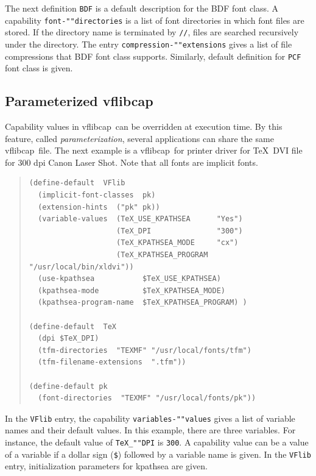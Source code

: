 \documentclass{cah-gut}
\newcommand{\pkg}[1]{\textsf{#1}}
\newcommand{\prog}[1]{\texttt{#1}}
\newcommand{\vflibcap}{\pkg{vflibcap}}
\begin{document}
The next definition \prog{BDF} is a default description for the BDF
font class.  A capability \prog{font-""directories} is a list of font
directories in which font files are stored.  If the directory name is
terminated by \prog{//}, files are searched recursively under the
directory.  The entry \prog{compression-""extensions} gives a list of
file compressions that BDF font class supports.
Similarly, default definition for \prog{PCF} font class is given.

\subsection{Parameterized \vflibcap}
\label{SUBSEC:VFLIBCAP:PARAM}

Capability values in \vflibcap\ can be overridden at execution time.
By this feature, called {\em parameterization}, several applications 
can share the same \vflibcap\ file.
The next example is a \vflibcap\ for printer driver for \TeX\ DVI file
for 300 dpi Canon Laser Shot.
Note that all fonts are implicit fonts.

\begin{quote}
\begin{small}\setlength{\baselineskip}{1em}
\begin{verbatim}
(define-default  VFlib
  (implicit-font-classes  pk)
  (extension-hints  ("pk" pk))
  (variable-values  (TeX_USE_KPATHSEA      "Yes")
                    (TeX_DPI               "300")
                    (TeX_KPATHSEA_MODE     "cx")
                    (TeX_KPATHSEA_PROGRAM  "/usr/local/bin/xldvi"))
  (use-kpathsea           $TeX_USE_KPATHSEA)
  (kpathsea-mode          $TeX_KPATHSEA_MODE)
  (kpathsea-program-name  $TeX_KPATHSEA_PROGRAM) )

(define-default  TeX
  (dpi $TeX_DPI)
  (tfm-directories  "TEXMF" "/usr/local/fonts/tfm")
  (tfm-filename-extensions  ".tfm"))

(define-default pk
  (font-directories  "TEXMF" "/usr/local/fonts/pk"))
\end{verbatim}
\end{small}
\end{quote}

In the \prog{VFlib} entry, the capability \prog{variables-""values}
gives a list of variable names and their default values.  In this
example, there are three variables. For instance, the default value of
\prog{TeX\_""DPI} is \prog{300}.  A capability value can be a value of
a variable if a dollar sign (\prog{\$}) followed by a variable name is given.  
In the \prog{VFlib} entry, initialization parameters for \pkg{kpathsea}
are given.
\end{document}
